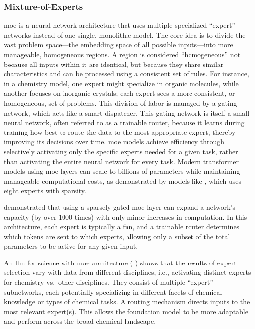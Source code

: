 \subsubsection{Mixture-of-Experts} \label{sec:arch-moes}
\gls{moe} is a neural network architecture that uses multiple specialized \enquote{expert} networks instead of one single, monolithic model. The core idea is to divide the vast problem space---the embedding space of all possible inputs---into more manageable, homogeneous regions. A region is considered \enquote{homogeneous} not because all inputs within it are identical, but because they share similar characteristics and can be processed using a consistent set of rules. For instance, in a chemistry model, one expert might specialize in organic molecules, while another focuses on inorganic crystals; each expert sees a more consistent, or homogeneous, set of problems. This division of labor is managed by a gating network, which acts like a smart dispatcher. This gating network is itself a small neural network, often referred to as a trainable router, because it learns during training how best to route the data to the most appropriate expert, thereby improving its decisions over time.
\gls{moe} models achieve efficiency through selectively activating only the specific experts needed for a given task, rather than activating the entire neural network for every task. Modern transformer models using \gls{moe} layers can scale to billions of parameters while maintaining manageable computational costs, as demonstrated by models like \autocite{jiang2024mixtral}, which uses eight experts with sparsity.

\textcite{shazeer2017outrageously} demonstrated that using a sparsely-gated \gls{moe} layer can expand a network’s capacity (by over 1000 times) with only minor increases in computation. In this architecture, each expert is typically a \gls{fnn}, and a trainable router determines which tokens are sent to which experts, allowing only a subset of the total parameters to be active for any given input. 
 
An \gls{llm} for science with \gls{moe} architecture ( \autocite{sun2024scidfm}) shows that the results of expert selection vary with data from different disciplines, i.e., activating distinct experts for chemistry vs.\ other disciplines. 
They consist of multiple \enquote{expert} subnetworks, each potentially specializing in different facets of chemical knowledge or types of chemical tasks. A routing mechanism directs inputs to the most relevant expert(s). This allows the foundation model to be more adaptable and perform across the broad chemical landscape.  


